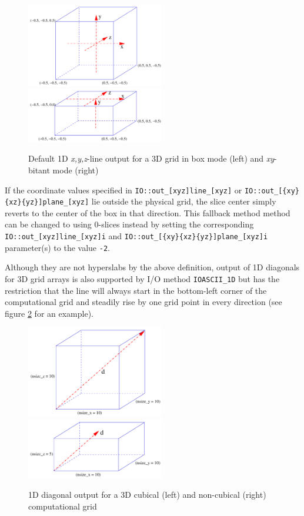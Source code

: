\documentclass{article}
\begin{document}
\begin{figure}[ht]
\begin{center}
\includegraphics[width=6cm]{1Dlines_in_box}
\includegraphics[width=6cm]{1Dlines_in_xyBitant}
\end{center}
\caption{Default 1D {\it x,y,z}-line output for a 3D grid in box mode (left) and {\it xy}-bitant mode (right)}
\label{default_1D_output}
\end{figure}

If the coordinate values specified in {\tt IO::out\_[xyz]line\_[xyz]}
or {\tt IO::out\_[\{xy\}\{xz\}\{yz\}]plane\_[xyz]} lie outside the physical
grid, the slice center simply reverts to the center of the box in that
direction. This fallback method method can be changed to using 0-slices instead
by setting the corresponding {\tt IO::out\_[xyz]line\_[xyz]i}
and {\tt IO::out\_[\{xy\}\{xz\}\{yz\}]plane\_[xyz]i} parameter(s) to the value
{\tt -2}.

Although they are not hyperslabs by the above definition, output of 1D diagonals
for 3D grid arrays is also supported by I/O method {\tt IOASCII\_1D} but has the
restriction that the line will always start in the bottom-left corner of the
computational grid and steadily rise by one grid point in every direction (see
figure \ref{default_diagonal_output} for an example).

\begin{figure}[ht]
\begin{center}
\includegraphics[width=6cm]{diagonal_in_cubic}
\includegraphics[width=6cm]{diagonal_in_noncubic}
\end{center}
\caption{1D diagonal output for a 3D cubical (left) and non-cubical (right)
computational grid}
\label{default_diagonal_output}
\end{figure}
\end{document}
